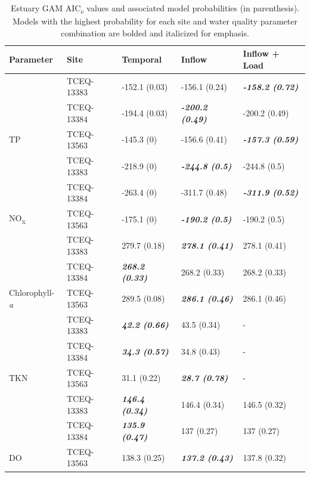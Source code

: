 \documentclass[fleqn,10pt,lineno]{wlpeerj} %
\begin{document}
\begin{table}

\caption{\label{tab:table4}Estuary GAM AIC\textsubscript{c} values and associated model probabilities (in parenthesis). Models with the highest probability for each site and water quality parameter combination are bolded and italicized for emphasis.}
\centering
\begin{tabular}[t]{ll>{}l>{}l>{}l}
\toprule
Parameter & Site & Temporal & Inflow & Inflow + Load\\
\midrule
 & TCEQ-13383 & -152.1 (0.03) & -156.1 (0.24) & \em{\textbf{-158.2 (0.72)}}\\

 & TCEQ-13384 & -194.4 (0.03) & \em{\textbf{-200.2 (0.49)}} & -200.2 (0.49)\\

\multirow{-3}{*}{\raggedright\arraybackslash TP} & TCEQ-13563 & -145.3 (0) & -156.6 (0.41) & \em{\textbf{-157.3 (0.59)}}\\
\cmidrule{1-5}
 & TCEQ-13383 & -218.9 (0) & \em{\textbf{-244.8 (0.5)}} & -244.8 (0.5)\\

 & TCEQ-13384 & -263.4 (0) & -311.7 (0.48) & \em{\textbf{-311.9 (0.52)}}\\

\multirow{-3}{*}{\raggedright\arraybackslash NO\textsubscript{x}} & TCEQ-13563 & -175.1 (0) & \em{\textbf{-190.2 (0.5)}} & -190.2 (0.5)\\
\cmidrule{1-5}
 & TCEQ-13383 & 279.7 (0.18) & \em{\textbf{278.1 (0.41)}} & 278.1 (0.41)\\

 & TCEQ-13384 & \em{\textbf{268.2 (0.33)}} & 268.2 (0.33) & 268.2 (0.33)\\

\multirow{-3}{*}{\raggedright\arraybackslash Chlorophyll-\textit{a}} & TCEQ-13563 & 289.5 (0.08) & \em{\textbf{286.1 (0.46)}} & 286.1 (0.46)\\
\cmidrule{1-5}
 & TCEQ-13383 & \em{\textbf{42.2 (0.66)}} & 43.5 (0.34) & -\\

 & TCEQ-13384 & \em{\textbf{34.3 (0.57)}} & 34.8 (0.43) & -\\

\multirow{-3}{*}{\raggedright\arraybackslash TKN} & TCEQ-13563 & 31.1 (0.22) & \em{\textbf{28.7 (0.78)}} & -\\
\cmidrule{1-5}
 & TCEQ-13383 & \em{\textbf{146.4 (0.34)}} & 146.4 (0.34) & 146.5 (0.32)\\

 & TCEQ-13384 & \em{\textbf{135.9 (0.47)}} & 137 (0.27) & 137 (0.27)\\

\multirow{-3}{*}{\raggedright\arraybackslash DO} & TCEQ-13563 & 138.3 (0.25) & \em{\textbf{137.2 (0.43)}} & 137.8 (0.32)\\
\bottomrule
\end{tabular}
\end{table}
\end{document}
